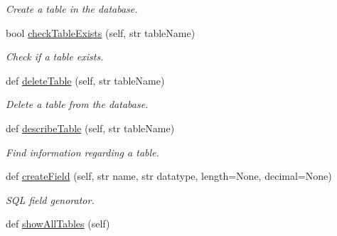\begin{DoxyCompactItemize}
\begin{DoxyCompactList}\small\item\em Create a table in the database. \end{DoxyCompactList}\item 
\mbox{\label{classsql_handler_1_1_sql_table_handler_a86f46ba78bfd8014a528ab54c3f86679}} 
bool \mbox{\hyperlink{classsql_handler_1_1_sql_table_handler_a86f46ba78bfd8014a528ab54c3f86679}{check\+Table\+Exists}} (self, str table\+Name)
\begin{DoxyCompactList}\small\item\em Check if a table exists. \end{DoxyCompactList}\item 
\mbox{\label{classsql_handler_1_1_sql_table_handler_a549b05c25620b0a24c94203bc7a6c5fd}} 
def \mbox{\hyperlink{classsql_handler_1_1_sql_table_handler_a549b05c25620b0a24c94203bc7a6c5fd}{delete\+Table}} (self, str table\+Name)
\begin{DoxyCompactList}\small\item\em Delete a table from the database. \end{DoxyCompactList}\item 
\mbox{\label{classsql_handler_1_1_sql_table_handler_a6d9536ea33d030274be1abb74471239d}} 
def \mbox{\hyperlink{classsql_handler_1_1_sql_table_handler_a6d9536ea33d030274be1abb74471239d}{describe\+Table}} (self, str table\+Name)
\begin{DoxyCompactList}\small\item\em Find information regarding a table. \end{DoxyCompactList}\item 
def \mbox{\hyperlink{classsql_handler_1_1_sql_table_handler_a0b726791958aa4a469f4ec8b37f8d53b}{create\+Field}} (self, str name, str datatype, length=None, decimal=None)
\begin{DoxyCompactList}\small\item\em S\+QL field genorator. \end{DoxyCompactList}\item 
\mbox{\label{classsql_handler_1_1_sql_table_handler_a43625806bd22c7004eea81abc0842722}} 
def \mbox{\hyperlink{classsql_handler_1_1_sql_table_handler_a43625806bd22c7004eea81abc0842722}{show\+All\+Tables}} (self)

\end{DoxyCompactItemize}
